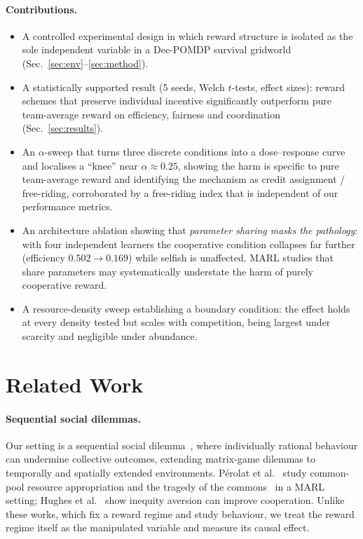 \documentclass[sigconf,nonacm,anonymous,review]{acmart}
\begin{document}
\paragraph{Contributions.}
\begin{itemize}
  \item A controlled experimental design in which reward structure is isolated as the sole
  independent variable in a Dec-POMDP survival gridworld (Sec.~\ref{sec:env}--\ref{sec:method}).
  \item A statistically supported result (5 seeds, Welch $t$-tests, effect sizes): reward
  schemes that preserve individual incentive significantly outperform pure team-average
  reward on efficiency, fairness and coordination (Sec.~\ref{sec:results}).
  \item An $\alpha$-sweep that turns three discrete conditions into a dose--response curve and
  localises a ``knee'' near $\alpha\approx0.25$, showing the harm is specific to pure
  team-average reward and identifying the mechanism as credit assignment / free-riding,
  corroborated by a free-riding index that is independent of our performance metrics.
  \item An architecture ablation showing that \emph{parameter sharing masks the pathology}:
  with four independent learners the cooperative condition collapses far further
  (efficiency $0.502\to0.169$) while selfish is unaffected. MARL studies that share
  parameters may systematically understate the harm of purely cooperative reward.
  \item A resource-density sweep establishing a boundary condition: the effect holds at every
  density tested but scales with competition, being largest under scarcity and negligible
  under abundance.
\end{itemize}

\section{Related Work}
\paragraph{Sequential social dilemmas.} Our setting is a sequential social
dilemma~\cite{leibo2017ssd}, where individually rational behaviour can undermine collective
outcomes, extending matrix-game dilemmas to temporally and spatially extended
environments. P{\'e}rolat et al.~\cite{perolat2017commons} study common-pool resource
appropriation and the tragedy of the commons~\cite{hardin1968tragedy} in a MARL setting;
Hughes et al.~\cite{hughes2018inequity} show inequity aversion can improve cooperation. Unlike
these works, which fix a reward regime and study behaviour, we treat the reward regime itself
as the manipulated variable and measure its causal effect.
\end{document}
